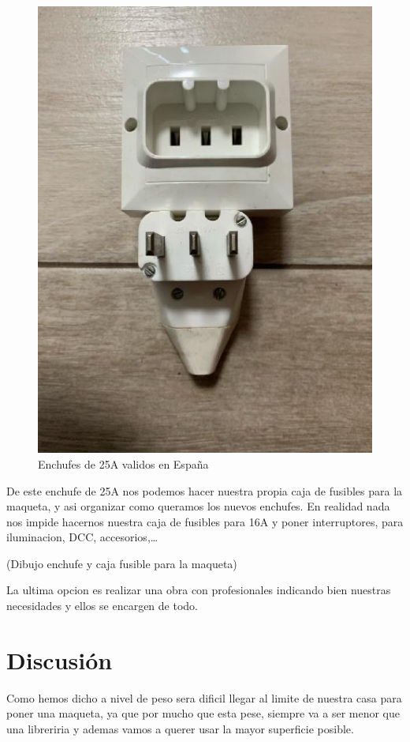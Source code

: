 \begin{figure}[h]
	\centering\includegraphics[scale=0.25]{chapters/0X_Normativas_02_MinimaLegal/25Aenchufe.jpg}

	\caption{Enchufes de 25A validos en España}
	\label{fig:25APared}
\end{figure}


De este enchufe de 25A nos podemos hacer nuestra propia caja de fusibles para la maqueta, y asi organizar como queramos los nuevos enchufes. En realidad nada nos impide hacernos nuestra caja de fusibles para 16A y poner interruptores, para iluminacion, DCC, accesorios,\dots

(Dibujo enchufe y caja fusible para la maqueta)

La ultima opcion es realizar una obra con profesionales indicando bien nuestras necesidades y ellos se encargen de todo.
\section{Discusión}
Como hemos dicho a nivel de peso sera dificil llegar al limite de nuestra casa para poner una maqueta, ya que por mucho que esta pese, siempre va a ser menor que una libreriria y ademas vamos a querer usar la mayor superficie posible.

